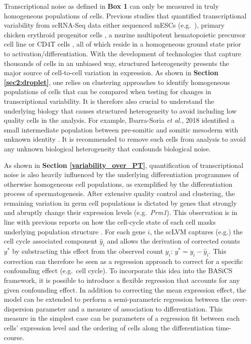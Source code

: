 Transcriptional noise as defined in \textbf{Box 1} can only be measured in truly homogeneous populations of cells. Previous studies that quantified transcriptional variability from scRNA-Seq data either sequenced mESCs (e.g.~\citep{Kolodziejczyk2015cell}), primary chicken erythroid progenitor cells \citep{Richard2016}, a murine multipotent hematopoietic precursor cell line \citep{Mojtahedi2016} or CD4\plus T cells \citep{Martinez-jimenez2017}, all of which reside in a homogeneous ground state prior to activation/differentiation. With the development of technologies that capture thousands of cells in an unbiased way, structured heterogeneity presents the major source of cell-to-cell variation in expression. As shown in \textbf{Section \ref{sec2:droplet}}, one relies on clustering approaches to identify homogeneous populations of cells that can be compared when testing for changes in transcriptional variability. It is therefore also crucial to understand the underlying biology that causes structured heterogeneity to avoid including low quality cells in the analysis. For example, Ibarra-Soria \emph{et al.}, 2018 identified a small intermediate population between pre-somitic and somitic mesoderm with unknown identity \citep{Ibarra-Soria2018}. It is recommended to remove such cells from analysis to avoid any unknown biological heterogeneity that confounds biological noise.

\newpage
 
As shown in \textbf{Section \ref{variability_over_PT}}, quantification of transcriptional noise is also heavily influenced by the underlying differentiation programmes of otherwise homogeneous cell populations, as exemplified by the differentiation process of spermatogenesis. After extensive quality control and clustering, the remaining variation in germ cell populations is dictated by genes that strongly and abruptly change their expression levels (e.g.~\textit{Prm1}). This observation is in line with previous reports on how the cell-cycle state of each cell masks underlying population structure \citep{Buettner2015}. For each gene $i$, the \gls{scLVM} captures (e.g.) the cell cycle associated component $\hat{y}_i$ and allows the derivation of corrected counts $y^{\ast}$ by substracting this effect from the observed count $y_i$: $y^{\ast}=y_i-\hat{y}_i$. This correction can therefore be seen as a regression approach to correct for a specific confounding effect (e.g.~cell cycle). To incorporate this idea into the BASiCS framework, it is possible to introduce a flexible regression that accounts for any given confounding effect. In addition to correcting the mean expression effect, the model can be extended to perform a semi-parametric regression between the over-dispersion parameter and a measure of association to differentiation. This measure in the simplest case can be parameters of a regression fit between each cells' expression level and the ordering of cells along the differentiation time-course. 


